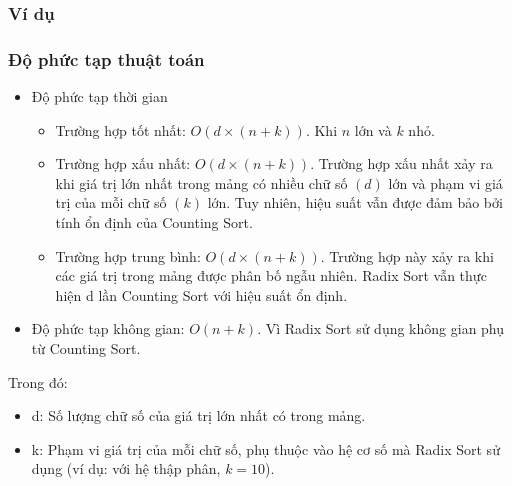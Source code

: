 \subsubsection{Ví dụ}

\subsubsection{Độ phức tạp thuật toán}

\begin{itemize}
    \item Độ phức tạp thời gian
    \begin{itemize}[label=$\circ$]
        \item Trường hợp tốt nhất: $O\left(d\times\left(n+k\right)\right)$. 
        Khi $n$ lớn và $k$ nhỏ. 
        \item Trường hợp xấu nhất: $O\left(d\times\left(n+k\right)\right)$. 
        Trường hợp xấu nhất xảy ra khi giá trị lớn nhất trong mảng có nhiều 
        chữ số $(d)$ lớn và phạm vi giá trị của mỗi chữ số $(k)$ lớn. Tuy nhiên, 
        hiệu suất vẫn được đảm bảo bởi tính ổn định của Counting Sort.
        \item Trường hợp trung bình: $O\left(d\times\left(n+k\right)\right)$. 
        Trường hợp này xảy ra khi các giá trị trong mảng được phân bố ngẫu nhiên. 
        Radix Sort vẫn thực hiện d lần Counting Sort với hiệu suất ổn định.
    \end{itemize}
    
    \item Độ phức tạp không gian: $O\left(n+k\right)$. Vì Radix Sort 
    sử dụng không gian phụ từ Counting Sort.

\end{itemize}

Trong đó:

\begin{itemize}[label=$\circ$]
    \item d: Số lượng chữ số của giá trị lớn nhất có trong mảng.
    \item k: Phạm vi giá trị của mỗi chữ số, phụ thuộc vào hệ cơ số 
    mà Radix Sort sử dụng (ví dụ: với hệ thập phân, $k=10$).
\end{itemize}